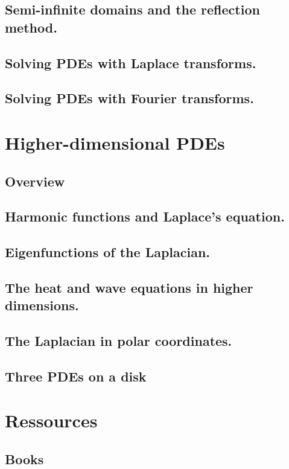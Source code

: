 \documentclass{article}
\begin{document}
\subsection{Semi-infinite domains and the reflection method.}
\subsection{Solving PDEs with Laplace transforms.}
\subsection{Solving PDEs with Fourier transforms.}
\pagebreak
\section{Higher-dimensional PDEs}
\subsection*{Overview}
\subsection{Harmonic functions and Laplace's equation.}
\subsection{Eigenfunctions of the Laplacian.}
\subsection{The heat and wave equations in higher dimensions.}
\subsection{The Laplacian in polar coordinates.}
\subsection{Three PDEs on a disk}

\pagebreak

\section{Ressources}%
\label{sec:Ressources}

\subsection{Books}%
\label{sub:Books}
\end{document}
